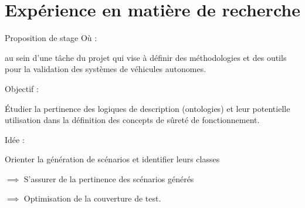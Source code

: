\documentclass[
  hyperref={
    pdfusetitle,
    pdfencoding=auto,
    psdextra,
    colorlinks=true,
    linkcolor=darkblue,
    citecolor=darkred,
    urlcolor=darkblue,
  },
  9pt,
  aspectratio=169,
]{beamer}
\begin{document}
\section{Expérience en matière de recherche}

\begin{frame}{Proposition de stage}
  Où :

  au sein d'une tâche du projet 
  qui vise à définir des méthodologies et des outils
  pour la validation des systèmes de véhicules autonomes.

  \medskip

  Objectif :

  Étudier la pertinence des logiques de description
  (ontologies)
  et leur potentielle utilisation dans la définition des concepts
  de sûreté de fonctionnement.

  \medskip

  Idée :

  Orienter la génération de scénarios
  et identifier leurs classes

  \(\implies\) S'assurer de la pertinence des scénarios générés

  \(\implies\) Optimisation de la couverture de test.
\end{frame}

\end{document}
